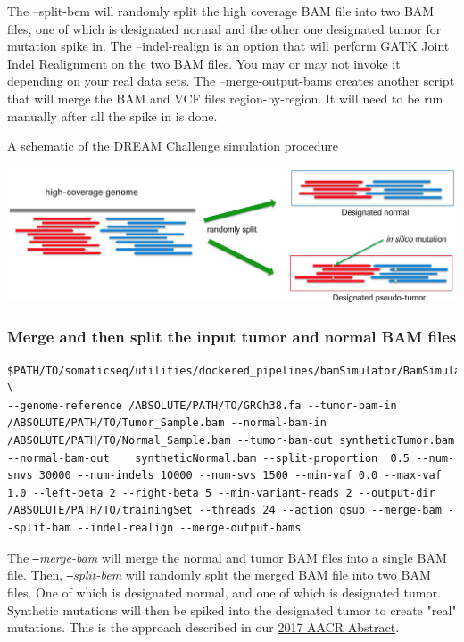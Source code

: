 \documentclass[10pt,letterpaper]{article}
\begin{document}
\begin{sloppypar}
The --split-bem will randomly split the high coverage BAM file into two BAM files, one of which is designated normal and the other one designated tumor for mutation spike in. The --indel-realign is an option that will perform GATK Joint Indel Realignment on the two BAM files. You may or may not invoke it depending on your real data sets. The --merge-output-bams creates another script that will merge the BAM and VCF files region-by-region. It will need to be run manually after all the spike in is done.

A schematic of the DREAM Challenge simulation procedure

\begin{center}
 \includegraphics[width=6.5in]{../somaticseq/utilities/dockered_pipelines/bamSimulator/dream_sim.jpg}
\end{center}



\subsubsection{Merge and then split the input tumor and normal BAM files}

\begin{lstlisting}
$PATH/TO/somaticseq/utilities/dockered_pipelines/bamSimulator/BamSimulator_multiThreads.sh \
--genome-reference /ABSOLUTE/PATH/TO/GRCh38.fa --tumor-bam-in /ABSOLUTE/PATH/TO/Tumor_Sample.bam --normal-bam-in /ABSOLUTE/PATH/TO/Normal_Sample.bam --tumor-bam-out syntheticTumor.bam --normal-bam-out    syntheticNormal.bam --split-proportion  0.5 --num-snvs 30000 --num-indels 10000 --num-svs 1500 --min-vaf 0.0 --max-vaf 1.0 --left-beta 2 --right-beta 5 --min-variant-reads 2 --output-dir /ABSOLUTE/PATH/TO/trainingSet --threads 24 --action qsub --merge-bam --split-bam --indel-realign --merge-output-bams
\end{lstlisting}

The \textit{\texttt{--}merge-bam} will merge the normal and tumor BAM files into a single BAM file. Then, \textit{\texttt{--}split-bem} will randomly split the merged BAM file into two BAM files. One of which is designated normal, and one of which is designated tumor. Synthetic mutations will then be spiked into the designated tumor to create "real" mutations. This is the approach described in our \href{http://dx.doi.org/10.1158/1538-7445.AM2017-386}{2017 AACR Abstract}.



\end{sloppypar}
\end{document}
